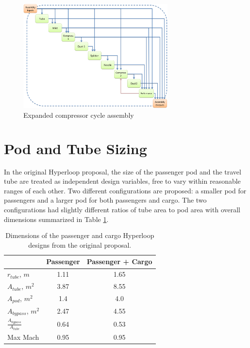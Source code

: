 \documentclass[heading.tex]{subfiles}
\begin{document}
\begin{figure}[H]
\centering
\includegraphics[width=0.7\textwidth]{images/compAssembly.png}
\caption{Expanded compressor cycle assembly}
\label{f:compressorXDSM}
\end{figure}


\section{Pod and Tube Sizing}
\label{s:sizing}

In the original Hyperloop proposal, the size of the passenger pod and the travel tube are treated as independent design variables, 
free to vary within reasonable ranges of each other. Two different configurations are proposed:
a smaller pod for passengers and a larger pod for both passengers and cargo.
The two configurations had slightly different ratios of tube area to pod area with overall dimensions summarized 
in Table \ref{t:hyperbase}. 

\begin{table}
  \centering
  \caption{Dimensions of the passenger and cargo Hyperloop designs from the original proposal. }
  \label{t:hyperbase}
  \begin{tabular}{l c c}
    \hline
                                  &  Passenger       & Passenger + Cargo \\ \hline
    $r_{tube}$, $m$              &        1.11      &     1.65  \\
    $A_{tube}$, $m^2$           &        3.87      &     8.55  \\
    $A_{pod}$, $m^2$             &        1.4       &     4.0   \\ 
    $A_{bypass}$, $m^2$          &        2.47      &     4.55  \\ 
    $\frac{A_{bypass}}{A_{tube}}$ &        0.64       &     0.53   \\
    Max Mach                      &        0.95       &     0.95   \\
    \hline
  \end{tabular}
\end{table}
\end{document}
